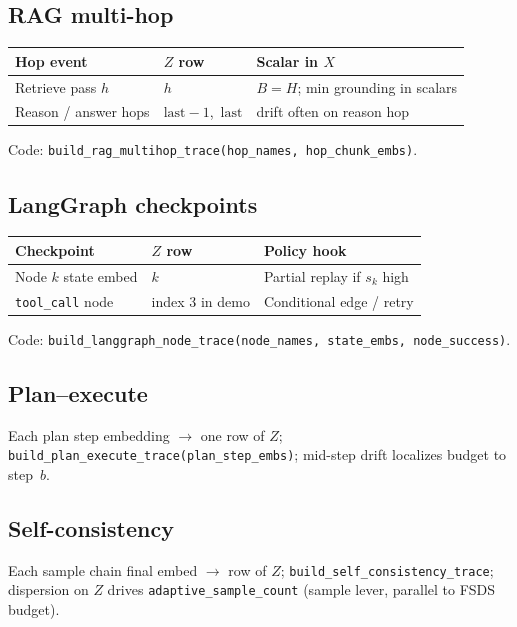 \documentclass[11pt]{article}
\begin{document}
\subsection{RAG multi-hop}
\begin{center}
\small
\begin{tabular}{@{}lll@{}}
\toprule
Hop event & $Z$ row & Scalar in $X$ \\
\midrule
Retrieve pass $h$ & $h$ & $B=H$; min grounding in scalars \\
Reason / answer hops & $\mathrm{last{-}1}$,\ $\mathrm{last}$ & drift often on reason hop \\
\bottomrule
\end{tabular}
\end{center}
Code: \texttt{build\_rag\_multihop\_trace(hop\_names, hop\_chunk\_embs)}.

\subsection{LangGraph checkpoints}
\begin{center}
\small
\begin{tabular}{@{}lll@{}}
\toprule
Checkpoint & $Z$ row & Policy hook \\
\midrule
Node $k$ state embed & $k$ & Partial replay if $s_k$ high \\
\texttt{tool\_call} node & index 3 in demo & Conditional edge / retry \\
\bottomrule
\end{tabular}
\end{center}
Code: \texttt{build\_langgraph\_node\_trace(node\_names, state\_embs, node\_success)}.

\subsection{Plan--execute}
Each plan step embedding $\rightarrow$ one row of $Z$; \texttt{build\_plan\_execute\_trace(plan\_step\_embs)}; mid-step drift localizes budget to step~$b$.

\subsection{Self-consistency}
Each sample chain final embed $\rightarrow$ row of $Z$; \texttt{build\_self\_consistency\_trace}; dispersion on $Z$ drives \texttt{adaptive\_sample\_count} (sample lever, parallel to FSDS budget).
\end{document}
